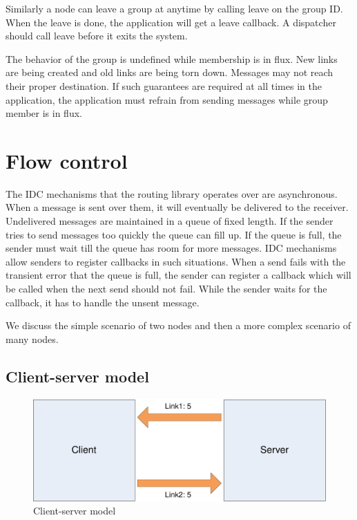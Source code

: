 \documentclass[a4paper,twoside]{report} %
\begin{document}
Similarly a node can leave a group at anytime by calling leave on the group ID.
When the leave is done, the application will get a leave callback.
A dispatcher should call leave before it exits the system.

The behavior of the group is undefined while membership is in flux.
New links are being created and old links are being torn down.
Messages may not reach their proper destination.
If such guarantees are required at all times in the application,
the application must refrain from sending messages while
group member is in flux.

\section{Flow control}
The IDC mechanisms that the routing library operates over are asynchronous.
When a message is sent over them,
it will eventually be delivered to the receiver.
Undelivered messages are maintained in a queue of fixed length.
If the sender tries to send messages too quickly the queue can fill up.
If the queue is full, the sender must wait
till the queue has room for more messages.
IDC mechanisms allow senders to register callbacks in such situations.
When a send fails with the transient error that
the queue is full, the sender can register
a callback which will be called when the next send should not fail.
While the sender waits for the callback, it has to handle the unsent message.

We discuss the simple scenario of two nodes and
then a more complex scenario of many nodes.

\subsection{Client-server model}

\begin{figure}[t]
 \includegraphics[width=\columnwidth]{client-server.pdf}
 \caption{Client-server model}\label{fig:client-server}
\end{figure}
\end{document}
